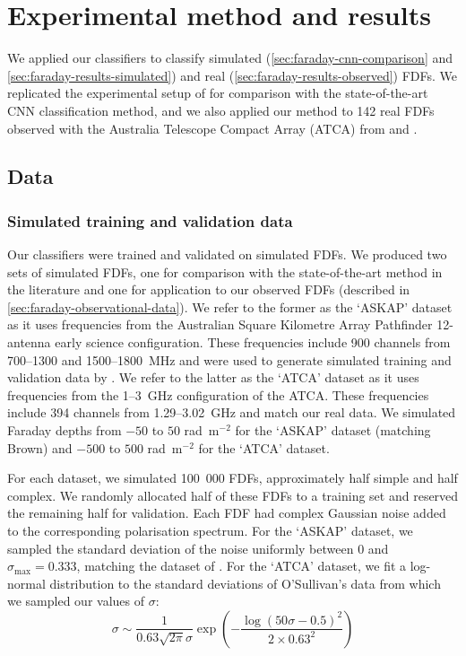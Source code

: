 \section{Experimental method and results}
\label{sec:faraday-experiment-classification}

  We applied our classifiers to classify simulated (\autoref{sec:faraday-cnn-comparison} and \ref{sec:faraday-results-simulated}) and real (\autoref{sec:faraday-results-observed}) FDFs. We replicated the experimental setup of \citet{brown_classifying_2018} for comparison with the state-of-the-art CNN classification method, and we also applied our method to 142 real FDFs observed with the Australia Telescope Compact Array (ATCA) from \citet{livingston21faraday} and \citet{osullivan_broad-band_2017}.

  \subsection{Data}

  \subsubsection{Simulated training and validation data}
  \label{sec:faraday-simulated-training-data}

    Our classifiers were trained and validated on simulated FDFs. We produced two sets of simulated FDFs, one for comparison with the state-of-the-art method in the literature and one for application to our observed FDFs (described in \autoref{sec:faraday-observational-data}). We refer to the former as the `ASKAP' dataset as it uses frequencies from the Australian Square Kilometre Array Pathfinder 12-antenna early science configuration. These frequencies include 900 channels from 700--1300 and 1500--1800~MHz and were used to generate simulated training and validation data by \citet{brown_classifying_2018}. We refer to the latter as the `ATCA' dataset as it uses frequencies from the 1--3~GHz configuration of the ATCA. These frequencies include 394 channels from 1.29--3.02~GHz and match our real data. We simulated Faraday depths from $-50$ to $50$ rad~m$^{-2}$ for the `ASKAP' dataset (matching Brown) and $-500$ to $500$ rad~m$^{-2}$ for the `ATCA' dataset.

    For each dataset, we simulated 100~000 FDFs, approximately half simple and half complex. We randomly allocated half of these FDFs to a training set and reserved the remaining half for validation. Each FDF had complex Gaussian noise added to the corresponding polarisation spectrum. For the `ASKAP' dataset, we sampled the standard deviation of the noise uniformly between 0 and $\sigma_{\max} = 0.333$, matching the dataset of \citet{brown_classifying_2018}.
    For the `ATCA' dataset, we fit a log-normal distribution to the standard deviations of O'Sullivan's data \citep{osullivan_broad-band_2017} from which we sampled our values of $\sigma$:
    \begin{equation}
      \sigma \sim \frac{1}{0.63 \sqrt{2 \pi} \sigma} \exp \left(-\frac{\log\left(50 \sigma - 0.5\right)^2}{2 \times 0.63^2}\right)
    \end{equation}


